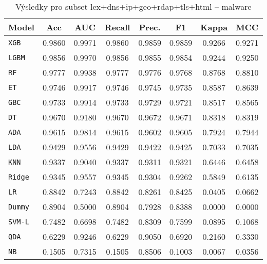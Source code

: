 \begin{table}[H]
  \centering
  \small
  \caption{Výsledky pro subset lex+dns+ip+geo+rdap+tls+html – malware}
  \begin{tabular}{|l|c|c|c|c|c|c|c|}
    \hline
    \textbf{Model} & \textbf{Acc} & \textbf{AUC} & \textbf{Recall} & \textbf{Prec.} & \textbf{F1} & \textbf{Kappa} & \textbf{MCC} \\
    \hline
    \texttt{XGB} & 0.9860 & 0.9971 & 0.9860 & 0.9859 & 0.9859 & 0.9266 & 0.9271 \\
    \texttt{LGBM} & 0.9856 & 0.9970 & 0.9856 & 0.9855 & 0.9854 & 0.9244 & 0.9250 \\
    \texttt{RF} & 0.9777 & 0.9938 & 0.9777 & 0.9776 & 0.9768 & 0.8768 & 0.8810 \\
    \texttt{ET} & 0.9746 & 0.9917 & 0.9746 & 0.9745 & 0.9735 & 0.8587 & 0.8639 \\
    \texttt{GBC} & 0.9733 & 0.9914 & 0.9733 & 0.9729 & 0.9721 & 0.8517 & 0.8565 \\
    \texttt{DT} & 0.9670 & 0.9180 & 0.9670 & 0.9672 & 0.9671 & 0.8318 & 0.8319 \\
    \texttt{ADA} & 0.9615 & 0.9814 & 0.9615 & 0.9602 & 0.9605 & 0.7924 & 0.7944 \\
    \texttt{LDA} & 0.9429 & 0.9556 & 0.9429 & 0.9422 & 0.9425 & 0.7033 & 0.7035 \\
    \texttt{KNN} & 0.9337 & 0.9040 & 0.9337 & 0.9311 & 0.9321 & 0.6446 & 0.6458 \\
    \texttt{Ridge} & 0.9345 & 0.9557 & 0.9345 & 0.9304 & 0.9262 & 0.5849 & 0.6135 \\
    \texttt{LR} & 0.8842 & 0.7243 & 0.8842 & 0.8261 & 0.8425 & 0.0405 & 0.0662 \\
    \texttt{Dummy} & 0.8904 & 0.5000 & 0.8904 & 0.7928 & 0.8388 & 0.0000 & 0.0000 \\
    \texttt{SVM-L} & 0.7482 & 0.6698 & 0.7482 & 0.8309 & 0.7599 & 0.0895 & 0.1068 \\
    \texttt{QDA} & 0.6229 & 0.9246 & 0.6229 & 0.9050 & 0.6920 & 0.2160 & 0.3330 \\
    \texttt{NB} & 0.1505 & 0.7315 & 0.1505 & 0.8506 & 0.1003 & 0.0067 & 0.0356 \\
    \hline
  \end{tabular}
\end{table}
\vspace{0.5cm}

